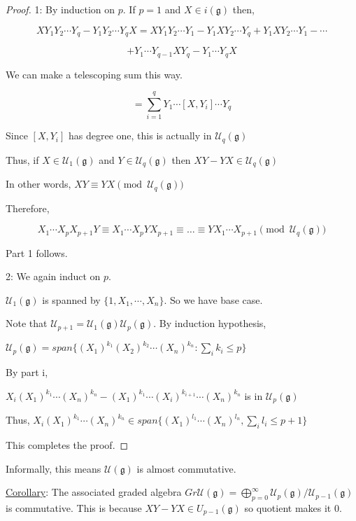 \documentclass{article}
\theoremstyle{definition}
\begin{document}
\begin{proof}
    1: By induction on \(p\). If \(p = 1\) and \(X\in i(\mathfrak{g})\) then,

    \[
        X Y_1 Y_2\cdots Y_q - Y_1 Y_2 \cdots Y_q X = X Y_1 Y_2\cdots Y_1 - Y_1 X Y_2\cdots Y_q + Y_1 X Y_2\cdots Y_1 -\cdots
    \]

    \[
        +Y_1\cdots Y_{q-1}X Y_q - Y_1\cdots Y_q X
    \]

    We can make a telescoping sum this way.

    \[
        = \sum_{i=1}^q Y_1\cdots [X,Y_i]\cdots Y_q
    \]

    Since \([X,Y_i]\) has degree one, this is actually in \(\mathcal{U}_q(\mathfrak{g})\) 
    
    Thus, if \(X\in \mathcal{U}_1(\mathfrak{g})\) and \(Y\in \mathcal{U} _q(\mathfrak{g})\) then \(XY-YX \in \mathcal{U}_q(\mathfrak{g})\)

    In other words, \(XY \equiv YX \pmod{\mathcal{U}_q(\mathfrak{g})}\) 

    Therefore,

    \[
        X_1 \cdots X_p X_{p+1} Y \equiv X_1\cdots X_p Y X_{p+1} \equiv \dots \equiv Y X_1 \cdots X_{p+1} \pmod{\mathcal{U}_q(\mathfrak{g})}
    \]

    Part 1 follows.

    2: We again induct on \(p\).

    \(\mathcal{U}_1(\mathfrak{g})\) is spanned by \(\{ 1, X_1,\cdots, X_n \} \). So we have base case.

    Note that \(\mathcal{U}_{p+1} = \mathcal{U}_1(\mathfrak{g}) \mathcal{U}_p(\mathfrak{g})\). By induction hypothesis,
    
    \(\mathcal{U}_p(\mathfrak{g})= span\{ (X_1)^{k_1} (X_2)^{k_2}\cdots (X_n)^{k_n} : \sum_{i} k_i \leq p \} \) 

    By part i, 

    \(X_i (X_1)^{k_1}\cdots (X_n)^{k_n} - (X_1)^{k_1}\cdots (X_i)^{k_{i+1}}\cdots (X_n)^{k_n}\) is in \(\mathcal{U}_p(\mathfrak{g})\) 

    Thus, \(X_i(X_1)^{k_1}\cdots (X_n)^{k_n}\in span\{ (X_1)^{l_1}\cdots (X_n)^{l_n}, \sum_{i} l_i \leq p+1 \} \) 

    This completes the proof.

\end{proof}

Informally, this means \(\mathcal{U}(\mathfrak{g} )\) is almost commutative.

\underline{Corollary}: The associated graded algebra \(Gr \mathcal{U} (\mathfrak{g}) = \bigoplus_{p=0}^{\infty} \mathcal{U}_p(\mathfrak{g}) / \mathcal{U}_{p-1}(\mathfrak{g})\) is commutative. This is because \(XY-YX\in U_{p-1}(\mathfrak{g})\) so quotient makes it \(0\).
\end{document}
